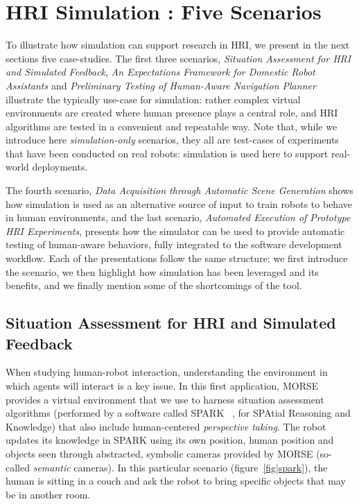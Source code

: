 \documentclass{llncs}
\begin{document}
\section{HRI Simulation : Five Scenarios}

To illustrate how simulation can support research in HRI, we present in the next
sections five case-studies.  The first three scenarios, \emph{Situation
Assessment for HRI and Simulated Feedback}, \emph{An Expectations Framework for
Domestic Robot Assistants} and \emph{Preliminary Testing of Human-Aware
Navigation Planner} illustrate the typically use-case for simulation: rather
complex virtual environments are created where human presence plays a
central role, and HRI algorithms are tested in a convenient and repeatable way.
Note that, while we introduce here \emph{simulation-only} scenarios, they all
are test-cases of experiments that have been conducted on real robots:
simulation is used here to support real-world deployments.

The fourth scenario, \emph{Data Acquisition through Automatic Scene Generation}
shows how simulation is used as an alternative source of input to train robots to
behave in human environments, and the last scenario, \emph{Automated Execution
of Prototype HRI Experiments}, presents how the simulator can be used to provide
automatic testing of human-aware behaviors, fully integrated to the software
development workflow. Each of the presentations follow the same structure: we
first introduce the scenario, we then highlight how simulation has been leveraged
and its benefits, and we finally mention some of the shortcomings of the tool.

\subsection{Situation Assessment for HRI and Simulated Feedback}
\label{sc:assessment}

When studying human-robot interaction, understanding the environment in which
agents will interact is a key issue. In this first application, MORSE provides a
virtual environment that we use to harness situation assessment algorithms
(performed by a software called SPARK ~\cite{Warnier2012a}, for SPAtial
Reasoning and Knowledge) that also include human-centered \emph{perspective
taking}. The robot updates its knowledge in SPARK using its own position, human
position and objects seen through abstracted, symbolic cameras provided by MORSE
(so-called \emph{semantic} cameras). In this particular scenario
(figure~\ref{fig|spark}), the human is sitting in a couch and ask the robot to
bring specific objects that may be in another room.
\end{document}
